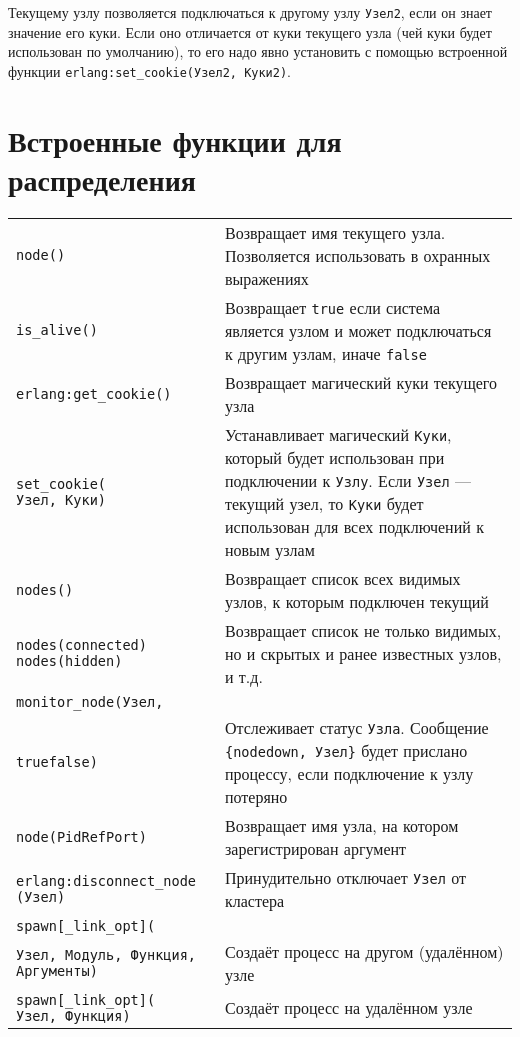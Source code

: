 Текущему узлу позволяется подключаться к другому узлу \texttt{Узел2}, если он
знает значение его куки.  Если оно отличается от куки текущего узла (чей куки 
будет использован по умолчанию), то его надо явно установить с помощью встроенной 
функции \texttt{erlang:set\_cookie(Узел2, Куки2)}.


\section{Встроенные функции для распределения}

\begin{center}
\begin{tabular}{|>{\raggedright}p{150pt}|>{\raggedright}p{280pt}|}
\hline
\multicolumn{2}{|p{326pt}|}{Встроенные функции для распределения}\tabularnewline
\hline
\texttt{node()}  & 
Возвращает имя текущего узла. Позволяется использовать в охранных выражениях
\tabularnewline
\hline
\texttt{is\_alive()}  & 
Возвращает \texttt{true} если система является узлом и может подключаться к другим 
узлам, иначе \texttt{false} \tabularnewline
\hline
\texttt{erlang:get\_cookie()}  & 
Возвращает магический куки текущего узла \tabularnewline
\hline
\texttt{set\_cookie(\\
	\qquad{}Узел, Куки)} & 
Устанавливает магический \texttt{Куки}, который будет использован при подключении 
к \texttt{Узлу}. Если \texttt{Узел} --- текущий узел, то \texttt{Куки} будет 
использован для всех подключений к новым узлам \tabularnewline
\hline
\texttt{nodes()}  & 
Возвращает список всех видимых узлов, к которым подключен текущий \tabularnewline
\hline
\texttt{nodes(connected)\\
	nodes(hidden)}  & 
Возвращает список не только видимых, но и скрытых и ранее известных узлов, и т.д. 
\tabularnewline
\hline
\texttt{monitor\_node(Узел,}\\
\texttt{\qquad{}true\textbar{}false)}  & 
Отслеживает статус \texttt{Узла}. Сообщение \texttt{\{nodedown, Узел\}} будет
прислано процессу, если подключение к узлу потеряно \tabularnewline
\hline
\texttt{node(Pid\textbar{}Ref\textbar{}Port)}  & 
Возвращает имя узла, на котором зарегистрирован аргумент \tabularnewline
\hline
\texttt{erlang:disconnect\_node\\
	\qquad(Узел)}  & 
Принудительно отключает \texttt{Узел} от кластера \tabularnewline
\hline
\texttt{spawn[\_link\textbar{}\_opt](}\\
\texttt{Узел, Модуль, Функция, 
	Аргументы)}  & Создаёт процесс на другом (удалённом) узле \tabularnewline
\hline
\texttt{spawn[\_link\textbar{}\_opt](\\
	Узел, Функция)}  & 
Создаёт процесс на удалённом узле \tabularnewline
\hline
\end{tabular}
\end{center}


